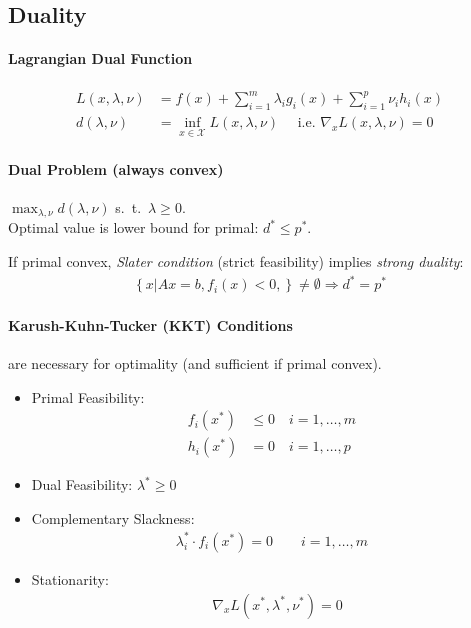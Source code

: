 \documentclass[landscape,a4paper,8pt]{scrartcl}
\newcommand{\mc}[1]{\mathcal{#1}}
\begin{document}
\begin{multicols*}{3}
\subsection{Duality}
\paragraph{Lagrangian Dual Function}
\begin{align*}
	L(x,\lambda,\nu) & = f(x) + \sum_{i=1}^{m}\lambda_i g_i(x) + \sum_{i=1}^{p}\nu_i h_i(x) \\
	d(\lambda,\nu) & = \inf_{x \in \mc{X}} L(x,\lambda,\nu) \quad \text{ i.e. } \nabla_x L(x, \lambda, \nu) = 0
\end{align*}
\paragraph{Dual Problem (always convex)} 
$\max_{\lambda,\nu} d(\lambda,\nu)$ s.\ t.\ $\lambda \geq 0$. \\
Optimal value is lower bound for primal: $d^* \leq p^*$.

If primal convex, \emph{Slater condition} (strict feasibility) implies \emph{strong duality}:
\begin{align*}
	\left\{x \left| \right. Ax=b, f_i(x)<0, \right\} \neq \emptyset \Rightarrow d^*  = p^*
\end{align*}

\paragraph{Karush-Kuhn-Tucker (KKT) Conditions}
are necessary for optimality (and sufficient if primal convex).
\begin{itemize}
	\item Primal Feasibility:
		\begin{align*}
			f_i(x^*) &\leq 0 \quad i=1,\dots,m\\
			h_i(x^*) &=0 \quad i=1,\dots,p
		\end{align*}
	\item Dual Feasibility:  $\lambda^* \geq 0$
	\item Complementary Slackness:
		\begin{align*}
			\lambda_i^* \cdot f_i(x^*) = 0 \quad \quad i=1,\dots,m
		\end{align*}
	\item Stationarity:
		\begin{align*}
			&\nabla_x L(x^*,\lambda^*,\nu^*) =0 \\
		\end{align*}
\end{itemize}


\end{multicols*}
\end{document}
